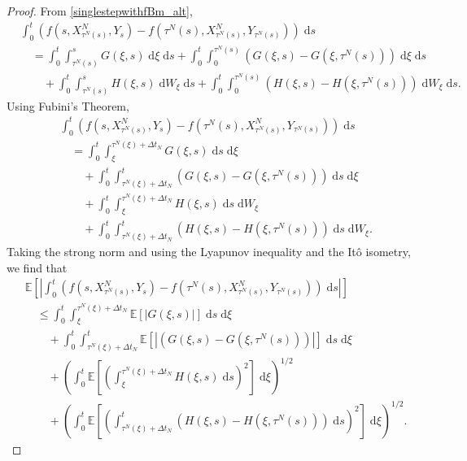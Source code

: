 \documentclass[reqno,12pt]{amsart}
\theoremstyle{plain}%
\theoremstyle{definition}
\begin{document}
\begin{proof}
    From \eqref{singlestepwithfBm_alt},
    \begin{align*}
        & \int_0^t \left(f(s, X_{\tau^N(s)}^N, Y_s) - f(\tau^N(s), X_{\tau^N(s)}^N, Y_{\tau^N(s)})\right)\;\mathrm{d}s \\
        & \quad = \int_0^t\int_{\tau^N(s)}^{s} G(\xi, s) \;\mathrm{d}\xi\;\mathrm{d}s + \int_0^t\int_0^{\tau^N(s)} (G(\xi, s) - G(\xi, \tau^N(s))) \;\mathrm{d}\xi\;\mathrm{d}s \\
        & \qquad + \int_0^t\int_{\tau^N(s)}^{s} H(\xi, s) \;\mathrm{d}W_\xi\;\mathrm{d}s + \int_0^t\int_0^{\tau^N(s)} (H(\xi, s) - H(\xi, \tau^N(s))) \;\mathrm{d}W_\xi\;\mathrm{d}s.
    \end{align*}
    Using Fubini's Theorem,
    \begin{align*}
        & \int_0^t \left(f(s, X_{\tau^N(s)}^N, Y_s) - f(\tau^N(s), X_{\tau^N(s)}^N, Y_{\tau^N(s)})\right)\;\mathrm{d}s \\
        & \quad = \int_0^t\int_\xi^{\tau^N(\xi) + \Delta t_N} G(\xi, s) \;\mathrm{d}s\;\mathrm{d}\xi \\
        & \qquad + \int_0^t\int_{\tau^N(\xi) + \Delta t_N}^t (G(\xi, s) - G(\xi, \tau^N(s))) \;\mathrm{d}s\;\mathrm{d}\xi \\
        & \qquad + \int_0^t\int_\xi^{\tau^N(\xi) + \Delta t_N} H(\xi, s) \;\mathrm{d}s\;\mathrm{d}W_\xi \\
        & \qquad + \int_0^t\int_{\tau^N(\xi) + \Delta t_N}^t (H(\xi, s) - H(\xi, \tau^N(s))) \;\mathrm{d}s\;\mathrm{d}W_\xi.
    \end{align*}
    Taking the strong norm and using the Lyapunov inequality and the It\^o isometry, we find that
    \begin{equation}
        \begin{aligned}
            & \mathbb{E}\left[\left|\int_0^t \left(f(s, X_{\tau^N(s)}^N, Y_s) - f(\tau^N(s), X_{\tau^N(s)}^N, Y_{\tau^N(s)})\right)\;\mathrm{d}s \right|\right] \\
            & \quad \leq \int_0^t\int_\xi^{\tau^N(\xi) + \Delta t_N} \mathbb{E}\left[\left| G(\xi, s)\right|\right] \;\mathrm{d}s\;\mathrm{d}\xi \\
            & \qquad + \int_0^t\int_{\tau^N(\xi) + \Delta t_N}^t \mathbb{E}\left[\left|(G(\xi, s) - G(\xi, \tau^N(s)))\right|\right] \;\mathrm{d}s\;\mathrm{d}\xi \\
            & \qquad + \left(\int_0^t\mathbb{E}\left[\left(\int_\xi^{\tau^N(\xi) + \Delta t_N} H(\xi, s) \;\mathrm{d}s\right)^2\right]\;\mathrm{d}\xi\right)^{1/2} \\
            & \qquad + \left(\int_0^t\mathbb{E}\left[\left(\int_{\tau^N(\xi) + \Delta t_N}^t (H(\xi, s) - H(\xi, \tau^N(s))) \;\mathrm{d}s\right)^2\right]\;\mathrm{d}\xi\right)^{1/2}.
        \end{aligned}
    \end{equation}
    

\end{proof}
\end{document}
